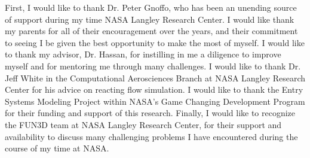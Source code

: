 \begin{acknowledgements}
First, I would like to thank Dr. Peter Gnoffo, who has been an unending source
of support during my time NASA Langley Research Center.  I would like thank my
parents for all of their encouragement over the years, and their commitment to
seeing I be given the best opportunity to make the most of myself.  I would like
to thank my advisor, Dr. Hassan, for instilling in me a diligence to improve
myself and for mentoring me through many challenges.  I would like to thank Dr.
Jeff White in the Computational Aerosciences Branch at NASA Langley Research
Center for his advice on reacting flow simulation. I would like to thank the
Entry Systems Modeling Project within NASA's Game Changing Development Program
for their funding and support of this research.  Finally, I would like to
recognize the FUN3D team at NASA Langley Research Center, for their support and
availability to discuss many challenging problems I have encountered during the
course of my time at NASA.
\end{acknowledgements}

\thesistableofcontents

\thesislistoftables

\thesislistoffigures
